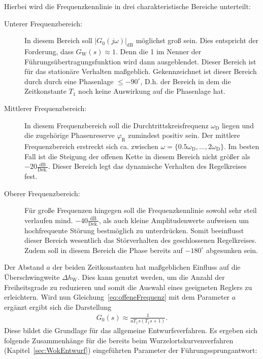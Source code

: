 %
Hierbei wird die Frequenzkennlinie in drei charakteristische Bereiche unterteilt:
%
\begin{description}
	\item[Unterer Frequenzbereich:] In diesem Bereich soll $|G_{0}(j\omega)|_{\text{dB}}$ möglichst groß sein. Dies entspricht der Forderung, dass $G_{\text{W}}(s)\approx 1$. Denn die 1 im Nenner der Führungsübertragungsfunktion wird dann ausgeblendet. Dieser Bereich ist für das stationäre Verhalten maßgeblich. Gekennzeichnet ist dieser Bereich durch durch eine Phasenlage $\leq-90^{\circ}$, D.h. der Bereich in dem die Zeitkonstante $T_{1}$ noch keine Auswirkung auf die Phasenlage hat.
	\item[Mittlerer Frequenzbereich:] In diesem Frequenzbereich soll die Durchtrittskreisfrequenz $\omega_{\text{D}}$ liegen und die zugehörige Phasenreserve $\varphi_{\text{R}}$ zumindest positiv sein. Der mittlere Frequenzbereich erstreckt sich ca. zwischen $\omega=\{0.5\omega_{\text{D}},\ldots,2\omega_{\text{D}}\}$. Im besten Fall ist die Steigung der offenen Kette in diesem Bereich nicht größer als $-20 \frac{\text{dB}}{\text{Dek.}}$. Dieser Bereich legt das dynamische Verhalten des Regelkreises fest.
	\item[Oberer Frequenzbereich:] Für große Frequenzen hingegen soll die Frequenzkennlinie sowohl sehr steil verlaufen mind. $-40\frac{\text{dB}}{\text{Dek.}}$, als auch kleine Amplitudenwerte aufweisen um hochfrequente Störung bestmöglich zu unterdrücken. Somit beeinflusst dieser Bereich wesentlich das Störverhalten des geschlossenen Regelkreises. Zudem soll in diesem Bereich die Phase bereits auf $-180^{\circ}$ abgesunken sein.
\end{description}	
%
Der Abstand $a$ der beiden Zeitkonstanten hat maßgeblichen Einfluss auf die Überschwingweite $\Delta h_{\text{W}}$. Dies kann genutzt werden, um die Anzahl der Freiheitsgrade zu reduzieren und somit die Auswahl eines geeigneten Reglers zu erleichtern. Wird nun Gleichung~\ref{eq:offeneFrequenz} mit dem Parameter $a$ ergänzt ergibt sich die Darstellung
%
\begin{equation}
\begin{aligned}
%
G_{0}(s)\approx \frac{1}{aT_{1}s\left(T_{1}s+1\right)}.
%
\end{aligned}
\end{equation}
%
Diese bildet die Grundlage für das allgemeine Entwurfsverfahren. Es ergeben sich folgende Zusammenhänge für die bereits beim Wurzelortskurvenverfahren (Kapitel~\ref{sec:WokEntwurf}) eingeführten Parameter der Führungssprungantwort:
